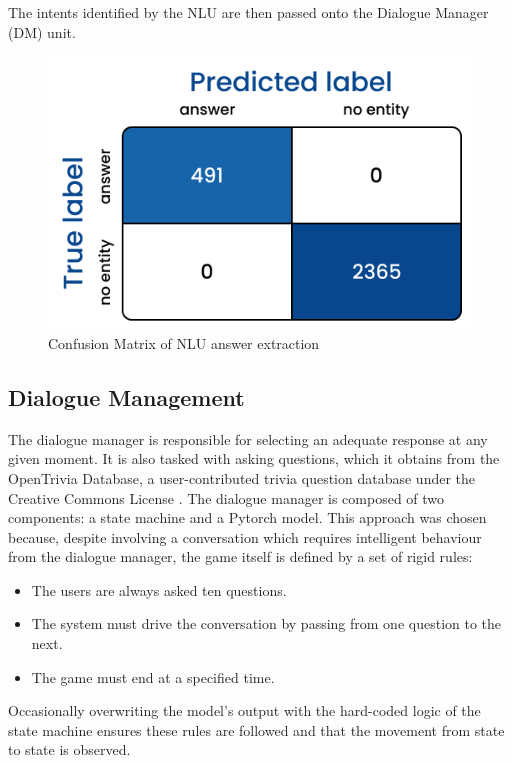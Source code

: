 \documentclass[hidelinks, 11pt]{article}
\begin{document}
The intents identified by the NLU are then passed onto the Dialogue Manager (DM) unit.

\begin{figure}[h!]
  \includegraphics[width=\columnwidth]{images/answer_confusion_matrix.jpg}
  \caption{Confusion Matrix of NLU answer extraction}
  \label{fig:cm_answer_extraction}
\end{figure}

\subsection{Dialogue Management}
\label{subsec:dialogue_management}
The dialogue manager is responsible for selecting an adequate response at any given moment. It is also tasked with asking questions, which it obtains from the OpenTrivia Database, a user-contributed trivia question database under the Creative Commons License \cite{Open_trivia_2023}. The dialogue manager is composed of two components: a state machine and a Pytorch model. This approach was chosen because, despite involving a conversation which requires intelligent behaviour from the dialogue manager, the game itself is defined by a set of rigid rules:

\begin{itemize}
  \item The users are always asked ten questions.
  \item The system must drive the conversation by passing from one question to the next.
  \item The game must end at a specified time.
\end{itemize}

\noindent Occasionally overwriting the model's output with the hard-coded logic of the state machine ensures these rules are followed and that the movement from state to state is observed.
\end{document}
